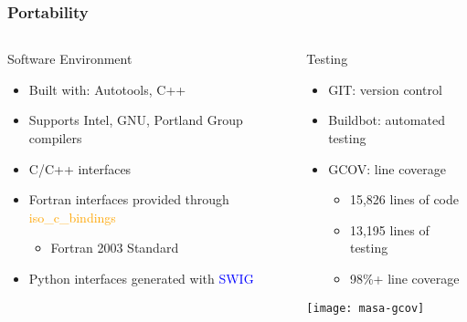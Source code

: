 \documentclass[mathserif]{beamer}
\begin{document}
\begin{frame}
  \frametitle{Portability}  

  \begin{columns}[c]
    \begin{column}{5cm}
      \begin{block}{Software Environment}  
        \begin{itemize}
          \small
        \item Built with: Autotools, C++
        \item Supports Intel, GNU, Portland Group compilers
        \item C/C++ interfaces
        \item Fortran interfaces provided through \textcolor{orange}{iso\_c\_bindings}
          \begin{itemize}
          \item \tiny Fortran 2003 Standard
          \end{itemize}
        \item Python interfaces generated with \textcolor{blue}{SWIG}
        \end{itemize}          
      \end{block}
    \end{column}

    \begin{column}{5cm}
      \begin{block}{Testing}  
        \begin{itemize}
        \item \small GIT: version control
        \item \small Buildbot: automated testing
        \item \small GCOV: line coverage
          \begin{itemize}
          \item \small 15,826 lines of code
          \item \small 13,195 lines of testing
          \item \small 98\%+ line coverage
          \end{itemize}          
        \end{itemize}          
      \end{block}

     \texttt{[image: masa-gcov]}
  
    \end{column}
  \end{columns}

\end{frame}
\end{document}
